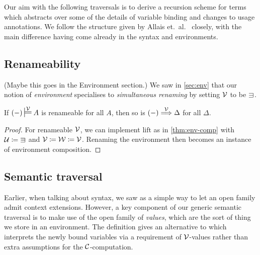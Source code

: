 Our aim with the following traversals is to derive a recursion scheme for
terms which abstracts over some of the details of variable binding and
changes to usage annotations.
We follow the structure given by Allais et.\ al.~\cite{AACMM21} closely, with
the main difference having come already in the syntax and environments.

\subsection{Renameability}

{\color{red}(Maybe this goes in the Environment section.)}
We saw in \cref{sec:env} that our notion of \emph{environment} specialises to
\emph{simultaneous renaming} by setting $\V$ to be $\sqni$.


\begin{lemma}\label{thm:env-ren}
  If $\plr{-} \sdtstile{}\V A$ is renameable for all $A$, then so is
  $\plr{-} \env\V \Delta$ for all $\Delta$.
\end{lemma}
\begin{proof}
  For renameable $\V$, we can implement $\mathrm{lift}$ as in
  \cref{thm:env-comp} with $\U \coloneqq {\sqni}$ and
  $\mathcal V \coloneqq \mathcal W \coloneqq \mathcal V$.
  Renaming the environment then becomes an instance of environment composition.
\end{proof}

\subsection{Semantic traversal}

Earlier, when talking about syntax, we saw  as a simple way
to let an open family admit context extensions.
However, a key component of our generic semantic traversal is to make use of
the open family \AgdaBound{$\V$} of \emph{values}, which are the sort of thing
we store in an environment.
The definition  gives an alternative to
 which interprets the newly bound variables via a
requirement of $\V$-values rather than extra assumptions for the
$\mathcal C$-computation.


